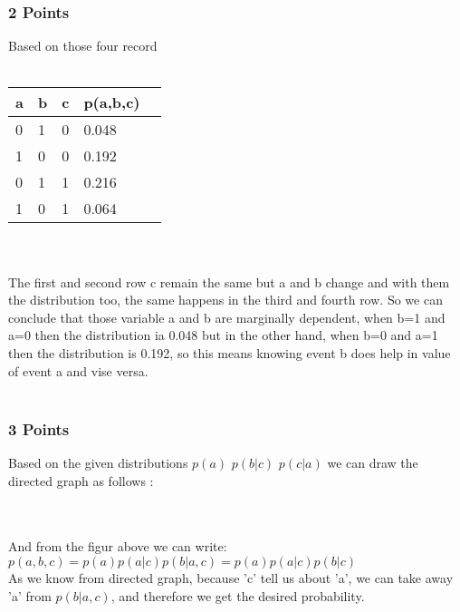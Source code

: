 \subsubsection{2 Points}
Based on those four record \\ \\
  \begin{tabular}{ | l | l | l | l | l |}
	    \hline
a &  b  &  c &   p(a,b,c)  \\ \hline
0	&   1	 &	0  & 0.048              \\ \hline
1	&   0	 &	0  &  0.192	          \\ \hline
0	&   1	 &	1  &  0.216	          \\ \hline
1	&   0	 &	1  &  0.064              \\ \hline

  \end{tabular}
\\ \\
The first and second row c remain the same but a and b change and with them the distribution too, the same happens in the third and fourth row. So we can conclude that those variable a and b are marginally dependent, when b=1 and a=0 then the distribution ia 0.048 but in the other hand, when b=0 and a=1 then the distribution is 0.192, so this means  knowing event b does help in value of event a and vise versa. \\ \\
\subsubsection{3 Points}

Based on the given distributions $p(a)$ $p(b|c)$ $p(c|a)$ we can draw the directed graph as follows :\\ \\
 \\
And from the figur above we can write:\\
$p(a,b,c)=p(a)p(a|c)p(b|a,c)
	    =p(a)p(a|c)p(b|c)$ \\
As we know from directed graph, because 'c' tell us about 'a', we can take away 'a' from $p(b|a,c)$, and therefore we get the desired probability.  


